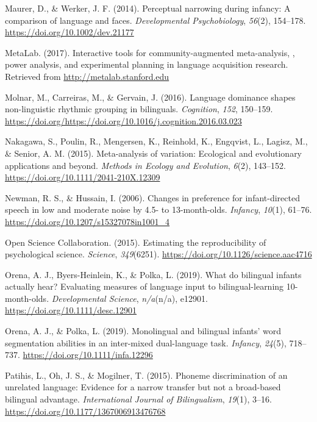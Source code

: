 \documentclass[,man,floatsintext]{apa6}
\begin{document}
\leavevmode\hypertarget{ref-maurer_2014}{}%
Maurer, D., \& Werker, J. F. (2014). Perceptual narrowing during infancy: A comparison of language and faces. \emph{Developmental Psychobiology}, \emph{56}(2), 154--178. \url{https://doi.org/10.1002/dev.21177}

\leavevmode\hypertarget{ref-metalab_2017}{}%
MetaLab. (2017). Interactive tools for community-augmented meta-analysis, , power analysis, and experimental planning in language acquisition research. Retrieved from \url{http://metalab.stanford.edu}

\leavevmode\hypertarget{ref-molnar_2016}{}%
Molnar, M., Carreiras, M., \& Gervain, J. (2016). Language dominance shapes non-linguistic rhythmic grouping in bilinguals. \emph{Cognition}, \emph{152}, 150--159. \url{https://doi.org/https://doi.org/10.1016/j.cognition.2016.03.023}

\leavevmode\hypertarget{ref-nakagawa_2015}{}%
Nakagawa, S., Poulin, R., Mengersen, K., Reinhold, K., Engqvist, L., Lagisz, M., \& Senior, A. M. (2015). Meta-analysis of variation: Ecological and evolutionary applications and beyond. \emph{Methods in Ecology and Evolution}, \emph{6}(2), 143--152. \url{https://doi.org/10.1111/2041-210X.12309}

\leavevmode\hypertarget{ref-newman_2006}{}%
Newman, R. S., \& Hussain, I. (2006). Changes in preference for infant-directed speech in low and moderate noise by 4.5- to 13-month-olds. \emph{Infancy}, \emph{10}(1), 61--76. \url{https://doi.org/10.1207/s15327078in1001_4}

\leavevmode\hypertarget{ref-open_science_collab_2015}{}%
Open Science Collaboration. (2015). Estimating the reproducibility of psychological science. \emph{Science}, \emph{349}(6251). \url{https://doi.org/10.1126/science.aac4716}

\leavevmode\hypertarget{ref-orena_2019}{}%
Orena, A. J., Byers-Heinlein, K., \& Polka, L. (2019). What do bilingual infants actually hear? Evaluating measures of language input to bilingual-learning 10-month-olds. \emph{Developmental Science}, \emph{n/a}(n/a), e12901. \url{https://doi.org/10.1111/desc.12901}

\leavevmode\hypertarget{ref-orena_polka_2019}{}%
Orena, A. J., \& Polka, L. (2019). Monolingual and bilingual infants' word segmentation abilities in an inter-mixed dual-language task. \emph{Infancy}, \emph{24}(5), 718--737. \url{https://doi.org/10.1111/infa.12296}

\leavevmode\hypertarget{ref-patihis_2015}{}%
Patihis, L., Oh, J. S., \& Mogilner, T. (2015). Phoneme discrimination of an unrelated language: Evidence for a narrow transfer but not a broad-based bilingual advantage. \emph{International Journal of Bilingualism}, \emph{19}(1), 3--16. \url{https://doi.org/10.1177/1367006913476768}
\end{document}
